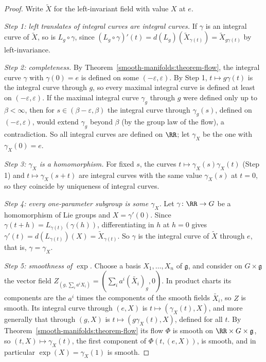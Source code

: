 \begin{proof}
Write $\widetilde{X}$ for the left-invariant field with value $X$ at $e$.

\emph{Step 1: left translates of integral curves are integral curves.} If $\gamma$ is an integral curve of $\widetilde{X}$, so is $L_g \circ \gamma$, since
$(L_g \circ \gamma)'(t) = d(L_g)(\widetilde{X}_{\gamma(t)}) = \widetilde{X}_{g\gamma(t)}$ by left-invariance.

\emph{Step 2: completeness.} By Theorem~\ref{smooth-manifolds:theorem-flow}, the integral curve $\gamma$ with $\gamma(0) = e$ is defined on some
$(-\varepsilon, \varepsilon)$. By Step 1, $t \mapsto g\gamma(t)$ is the integral curve through $g$, so every maximal integral curve is defined at least on
$(-\varepsilon, \varepsilon)$. If the maximal integral curve $\gamma_g$ through $g$ were defined only up to $\beta < \infty$, then for $s \in (\beta - \varepsilon,
\beta)$ the integral curve through $\gamma_g(s)$, defined on $(-\varepsilon, \varepsilon)$, would extend $\gamma_g$ beyond $\beta$ (by the group law of the flow),
a contradiction. So all integral curves are defined on $\RR$; let $\gamma_X$ be the one with $\gamma_X(0) = e$.

\emph{Step 3: $\gamma_X$ is a homomorphism.} For fixed $s$, the curves $t \mapsto \gamma_X(s)\gamma_X(t)$ (Step 1) and $t \mapsto \gamma_X(s + t)$ are integral
curves with the same value $\gamma_X(s)$ at $t = 0$, so they coincide by uniqueness of integral curves.

\emph{Step 4: every one-parameter subgroup is some $\gamma_X$.} Let $\gamma \colon \RR \to G$ be a homomorphism of Lie groups and $X = \gamma'(0)$. Since
$\gamma(t + h) = L_{\gamma(t)}(\gamma(h))$, differentiating in $h$ at $h = 0$ gives $\gamma'(t) = d(L_{\gamma(t)})(X) = \widetilde{X}_{\gamma(t)}$. So $\gamma$ is
the integral curve of $\widetilde{X}$ through $e$, that is, $\gamma = \gamma_X$.

\emph{Step 5: smoothness of $\exp$.} Choose a basis $X_1, \ldots, X_n$ of $\mathfrak{g}$, and consider on $G \times \mathfrak{g}$ the vector field
$Z_{(g, \sum_ia^iX_i)} = (\sum_ia^i(\widetilde{X_i})_g, 0)$. In product charts its components are the $a^i$ times the components of the smooth fields
$\widetilde{X_i}$, so $Z$ is smooth. Its integral curve through $(e, X)$ is $t \mapsto (\gamma_X(t), X)$, and more generally that through $(g, X)$ is
$t \mapsto (g\gamma_X(t), X)$, defined for all $t$. By Theorem~\ref{smooth-manifolds:theorem-flow} its flow $\Phi$ is smooth on $\RR \times G \times \mathfrak{g}$,
so $(t, X) \mapsto \gamma_X(t)$, the first component of $\Phi(t, (e, X))$, is smooth, and in particular $\exp(X) = \gamma_X(1)$ is smooth.


\end{proof}
